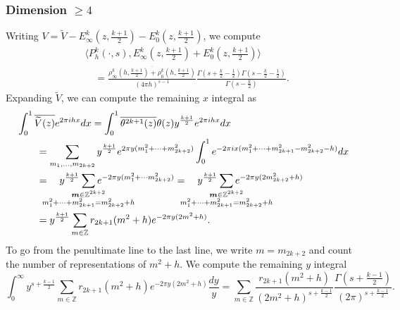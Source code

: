 \subsubsection*{Dimension $\geq 4$}

Writing $V = \widetilde{V} - E_\infty^k(z, \frac{k+1}{2}) - E_0^k(z, \frac{k+1}{2})$, we
compute
\begin{align}
  &\langle P_h^k(\cdot, s), E_\infty^k(z, \tfrac{k+1}{2}) + E_0^k(z, \tfrac{k+1}{2})
\rangle \\
  &\quad = \frac{\overline{\rho_\infty^k(h, \frac{k+1}{2}) + \rho_0^k(h,
  \frac{k+1}{2})}}{(4\pi h)^{s-1}} \frac{\Gamma(s + \frac{k}{2} - \frac{1}{2}) \Gamma(s -
\frac{k}{2} - \frac{1}{2})}{\Gamma(s - \frac{k}{2})}.
\end{align}
Expanding $\widetilde{V}$, we can compute the remaining $x$ integral as
\begin{align}
  &\int_0^1 \overline{\widetilde{V}(z)} e^{2\pi i h x} dx = \int_0^1
  \overline{\theta^{2k+1}(z)}\theta(z)y^{\frac{k+1}{2}} e^{2\pi i h x} dx \\
  &\qquad = \sum_{m_1, \ldots, m_{2k+2}} y^{\frac{k+1}{2}} e^{2\pi y(m_1^2 + \cdots +
m_{2k+2}^2)} \int_0^1 e^{-2\pi i x(m_1^2 + \cdots + m_{2k+1}^2 - m_{2k+2}^2 - h)} dx \\
  &\qquad = \quad y^{\frac{k+1}{2}}
  \sum_{\mathclap{\substack{\bm{m} \in \mathbb{Z}^{2k+2} \\
  m_1^2 + \cdots + m_{2k+1}^2 = m_{2k+2}^2 + h}}} e^{-2\pi y(m_1^2 + \cdots m_{2k+2}^2)} =
  \quad y^{\frac{k+1}{2}} \sum_{\mathclap{\substack{\bm{m} \in \mathbb{Z}^{2k+2} \\
  m_1^2 + \cdots + m_{2k+1}^2 = m_{2k+2}^2 + h}}} e^{-2\pi y(2m_{2k+2}^2 + h)} \\
  &\qquad = y^{\frac{k+1}{2}} \sum_{m \in \mathbb{Z}} r_{2k+1}(m^2 + h)
  e^{-2\pi y (2m^2 + h)}.
\end{align}
To go from the penultimate line to the last line, we write $m = m_{2k+2}$ and count the
number of representations of $m^2 + h$.
We compute the remaining $y$ integral
\begin{equation}
  \int_0^\infty y^{s + \frac{k-1}{2}} \sum_{m \in \mathbb{Z}} r_{2k+1}(m^2 + h) e^{-2\pi
  y(2m^2 + h)} \frac{dy}{y} = \sum_{m \in \mathbb{Z}} \frac{r_{2k+1}(m^2 + h)}{(2m^2 +
  h)^{s + \frac{k-1}{2}}} \frac{\Gamma(s + \frac{k-1}{2})}{(2\pi)^{s + \frac{k-1}{2}}}.
\end{equation}



